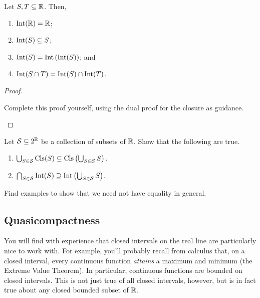 \begin{thm}
Let $S,T\subseteq \mathbb{R}$.  Then,
\begin{enumerate}
\item $\operatorname{Int} (\mathbb{R} )=\mathbb{R}$;
\item $\operatorname{Int} (S)\subseteq S$;
\item $\operatorname{Int} (S)=\operatorname{Int} \left( \operatorname{Int} (S)\right)$; and
\item $\operatorname{Int} (S\cap T)=\operatorname{Int} (S)\cap \operatorname{Int} (T)$.
\end{enumerate}
\begin{proof}
\begin{exr}
Complete this proof yourself, using the dual proof for the closure as guidance.
\end{exr}
\end{proof}
\end{thm}
\begin{exr}\label{exr3.4.53}
Let $\mathcal{S}\subseteq 2^{\mathbb{R}}$ be a collection of subsets of $\mathbb{R}$.  Show that the following are true.
\begin{enumerate}
\item $\bigcup _{S\in \mathcal{S}}\operatorname{Cls} (S)\subseteq \operatorname{Cls} \left( \bigcup _{S\in \mathcal{S}}S\right)$.
\item $\bigcap _{S\in \mathcal{S}}\operatorname{Int} (S)\supseteq \operatorname{Int} \left( \bigcup _{S\in \mathcal{S}}S\right)$.
\end{enumerate}
Find examples to show that we need not have equality in general.
\end{exr}

\subsection{Quasicompactness}

You will find with experience that closed intervals on the real line are particularly nice to work with.  For example, you'll probably recall from calculus that, on a closed interval, every continuous function \emph{attains} a maximum and minimum (the Extreme Value Theorem).  In particular, continuous functions are bounded on closed intervals.  This is not just true of all closed intervals, however, but is in fact true about any closed bounded subset of $\mathbb{R}$.

